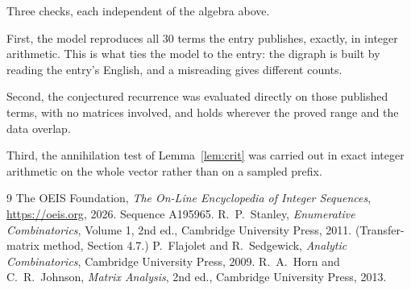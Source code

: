 \documentclass[11pt,a4paper]{article}
\theoremstyle{plain}
\theoremstyle{definition}
\begin{document}
Three checks, each independent of the algebra above.

First, the model reproduces all $30$ terms the entry publishes, exactly, in integer
arithmetic. This is what ties the model to the entry: the digraph is built by reading the
entry's English, and a misreading gives different counts.

Second, the conjectured recurrence was evaluated directly on those published terms, with no
matrices involved, and holds wherever the proved range and the data overlap.

Third, the annihilation test of Lemma~\ref{lem:crit} was carried out in exact integer
arithmetic on the whole vector rather than on a sampled prefix.

\begin{thebibliography}{9}
 The OEIS Foundation, \emph{The On-Line Encyclopedia of Integer
Sequences}, \url{https://oeis.org}, 2026. Sequence A195965.
 R.~P.~Stanley, \emph{Enumerative Combinatorics}, Volume 1, 2nd ed.,
Cambridge University Press, 2011. (Transfer-matrix method, Section 4.7.)
 P.~Flajolet and R.~Sedgewick, \emph{Analytic Combinatorics}, Cambridge
University Press, 2009.
 R.~A.~Horn and C.~R.~Johnson, \emph{Matrix Analysis}, 2nd ed., Cambridge
University Press, 2013.
\end{thebibliography}
\end{document}
